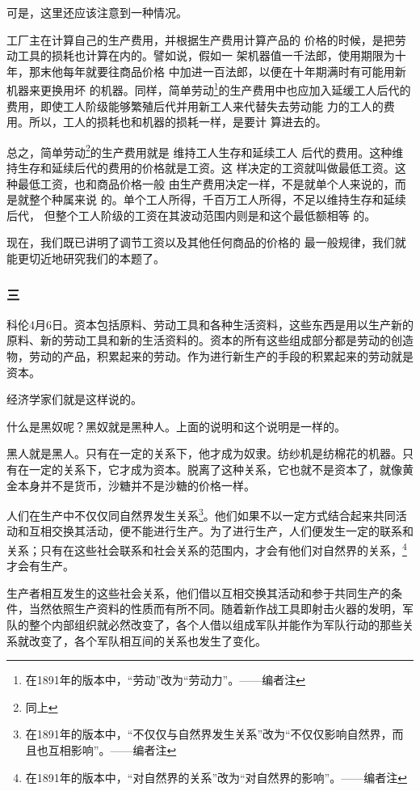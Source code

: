 \documentclass[a4paper,twoside,12pt,AutoFakeBold]{ctexart}
\begin{document}
可是，这里还应该注意到一种情况。

工厂主在计算自己的生产费用，并根据生产费用计算产品的
价格的时候，是把劳动工具的损耗也计算在内的。譬如说，假如一
架机器值一千法郎，使用期限为十年，那末他每年就要往商品价格
中加进一百法郎，以便在十年期满时有可能用新机器来更换用坏
的机器。同样，简单劳动\footnote{在1891年的版本中，“劳动”改为“劳动力”。——编者注}的生产费用中也应加入延缓工人后代的
费用，即使工人阶级能够繁殖后代并用新工人来代替失去劳动能
力的工人的费用。所以，工人的损耗也和机器的损耗一样，是要计
算进去的。

总之，简单劳动\footnote{同上}的生产费用就是 维持工人生存和延续工人
后代的费用。这种维持生存和延续后代的费用的价格就是工资。这
样决定的工资就叫做最低工资。这种最低工资，也和商品价格一般
由生产费用决定一样，不是就单个人来说的，而是就整个种属来说
的。单个工人所得，千百万工人所得，不足以维持生存和延续后代，
但整个工人阶级的工资在其波动范围内则是和这个最低额相等
的。

现在，我们既已讲明了调节工资以及其他任何商品的价格的
最一般规律，我们就能更切近地研究我们的本题了。

\subsubsection{三}

科伦4月6日。资本包括原料、劳动工具和各种生活资料，这些东西是用以生产新的原料、新的劳动工具和新的生活资料的。资本的所有这些组成部分都是劳动的创造物，劳动的产品，积累起来的劳动。作为进行新生产的手段的积累起来的劳动就是资本。

经济学家们就是这样说的。

什么是黑奴呢？黑奴就是黑种人。上面的说明和这个说明是一样的。

黑人就是黑人。只有在一定的关系下，他才成为奴隶。纺纱机是纺棉花的机器。只有在一定的关系下，它才成为资本。脱离了这种关系，它也就不是资本了，就像黄金本身并不是货币，沙糖并不是沙糖的价格一样。

人们在生产中不仅仅同自然界发生关系\footnote{在1891年的版本中，“不仅仅与自然界发生关系”改为“不仅仅影响自然界，而且也互相影响”。——编者注}。他们如果不以一定方式结合起来共同活动和互相交换其活动，便不能进行生产。为了进行生产，人们便发生一定的联系和关系；只有在这些社会联系和社会关系的范围内，才会有他们对自然界的关系，\footnote{在1891年的版本中，“对自然界的关系”改为“对自然界的影响”。——编者注}才会有生产。

生产者相互发生的这些社会关系，他们借以互相交换其活动和参于共同生产的条件，当然依照生产资料的性质而有所不同。随着新作战工具即射击火器的发明，军队的整个内部组织就必然改变了，各个人借以组成军队并能作为军队行动的那些关系就改变了，各个军队相互间的关系也发生了变化。
\end{document}
